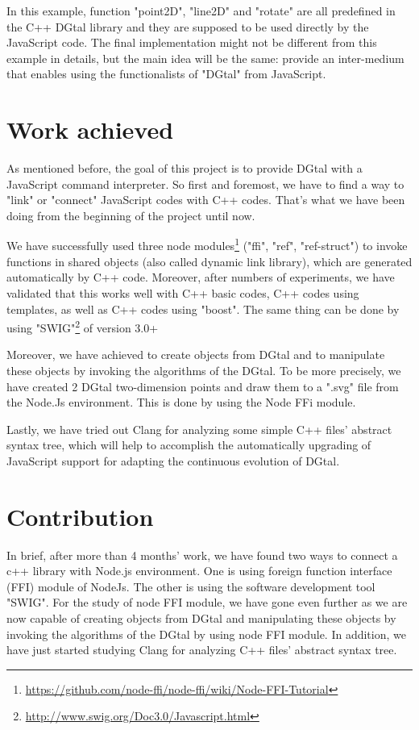 In this example, function "point2D", "line2D" and "rotate" are all predefined in the C++ DGtal library and they are supposed to be used directly by the JavaScript code. The final implementation might not be different from this example in details, but the main idea will be the same: provide an inter-medium that enables using the functionalists of "DGtal" from JavaScript.


\section{Work achieved}

As mentioned before, the goal of this project is to provide DGtal with a JavaScript command interpreter. So first and foremost, we have to find a way to "link" or "connect" JavaScript codes with C++ codes. That's what we have been doing from the beginning of the project until now.


We have successfully used three node modules\footnote{\url{https://github.com/node-ffi/node-ffi/wiki/Node-FFI-Tutorial}} ("ffi", "ref", "ref-struct") to invoke functions in shared objects (also called dynamic link library), which are generated automatically by C++ code. Moreover, after numbers of experiments, we have validated that this works well with C++ basic codes, C++ codes using templates, as well as C++ codes using "boost". The same thing can be done by using "SWIG"\footnote{\url{http://www.swig.org/Doc3.0/Javascript.html}} of version 3.0+


Moreover, we have achieved to create objects from DGtal and to manipulate these objects by invoking the algorithms of the DGtal. To be more precisely, we have created 2 DGtal two-dimension points and draw them to a ".svg" file from the Node.Js environment. This is done by using the Node FFi module.

Lastly, we have tried out Clang for analyzing some simple C++ files' abstract syntax tree, which will help to accomplish the automatically upgrading of JavaScript support for adapting the continuous evolution of DGtal.


\section{Contribution}

In brief, after more than 4 months' work, we have found two ways to connect a c++ library with Node.js environment. One is using foreign function interface (FFI) module of NodeJs. The other is using the software development tool "SWIG". For the study of node FFI module, we have gone even further as we are now capable of creating objects from DGtal and manipulating these objects by invoking the algorithms of the DGtal by using node FFI module. In addition, we have just started studying Clang for analyzing C++ files' abstract syntax tree.

